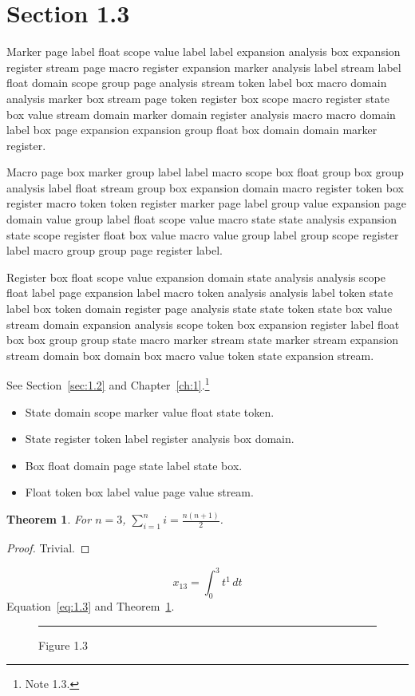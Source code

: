 \documentclass[11pt,twoside]{book}
\newtheorem{theorem}{Theorem}[chapter]
\begin{document}
\section{Section 1.3}\label{sec:1.3}
Marker page label float scope value label label expansion analysis box expansion register stream page macro register expansion marker analysis label stream label float domain scope group page analysis stream token label box macro domain analysis marker box stream page token register box scope macro register state box value stream domain marker domain register analysis macro macro domain label box page expansion expansion group float box domain domain marker register.

Macro page box marker group label label macro scope box float group box group analysis label float stream group box expansion domain macro register token box register macro token token register marker page label group value expansion page domain value group label float scope value macro state state analysis expansion state scope register float box value macro value group label group scope register label macro group group page register label.

Register box float scope value expansion domain state analysis analysis scope float label page expansion label macro token analysis analysis label token state label box token domain register page analysis state state token state box value stream domain expansion analysis scope token box expansion register label float box box group group state macro marker stream state marker stream expansion stream domain box domain box macro value token state expansion stream.

See Section~\ref{sec:1.2} and Chapter~\ref{ch:1}.\footnote{Note 1.3.}
\begin{itemize}\item State domain scope marker value float state token.\item State register token label register analysis box domain.\item Box float domain page state label state box.\item Float token box label value page value stream.\end{itemize}
\begin{theorem}\label{thm:1.3}For $n=3$, $\sum_{i=1}^{n}i=\frac{n(n+1)}{2}$.\end{theorem}\begin{proof}Trivial.\end{proof}
\begin{equation}x_{13}=\int_0^{3}t^{1}\,dt\label{eq:1.3}\end{equation} Equation~\eqref{eq:1.3} and Theorem~\ref{thm:1.3}.
\begin{figure}[ht]\centering\rule{4cm}{2cm}\caption{Figure 1.3}\label{fig:1.3}\end{figure}
\end{document}
